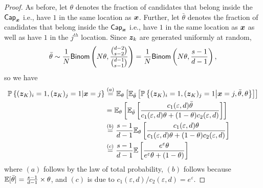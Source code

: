 \begin{proof}
As before, let $\theta$ denotes the fraction of candidates that belong inside the $\mathsf{Cap}_{{\boldsymbol{x}}}$ i.e., have $1$ in the same location as ${\boldsymbol{x}}$. Further, let $\bar{\theta}$ denotes the fraction of candidates that belong inside the $\mathsf{Cap}_{{\boldsymbol{x}}}$ i.e., have $1$ in the same location as ${\boldsymbol{x}}$ as well as have $1$ in the $j^{th}$ location. Since ${\boldsymbol{z}}_k$ are generated uniformly at random,
$$ \bar{\theta} \sim \frac{1}{N} \mathsf{Binom}\left( N\theta, \frac{\binom{d-2}{s-2}}{\binom{d-1}{s-1}} \right) = \frac{1}{N} \mathsf{Binom}\left( N\theta, \frac{s-1}{d-1} \right),$$ so we have
\begin{align}
    \mathbb{P}\left\{ ({\boldsymbol{z}}_K)_i = 1, ({\boldsymbol{z}}_K)_j = 1 | {\boldsymbol{x}} = j \right\} 
    & \stackrel{(a)}{=} \mathbb{E}_{\theta}\left[ \mathbb{E}_{\bar{\theta}}\left[ \mathbb{P}\left\{ ({\boldsymbol{z}}_K)_i = 1, ({\boldsymbol{z}}_K)_j = 1 \middle\vert {\boldsymbol{x}} = j, \bar{\theta}, \theta \right\} \right]\right] \\
    & = \mathbb{E}_{\theta}\left[ \mathbb{E}_{\bar{\theta}}\left[ \frac{ c_1(\varepsilon,d)\bar{\theta}}{ c_1(\varepsilon,d) \theta  + (1 - \theta) c_2(\varepsilon,d)} \right]\right] \\ 
    & \stackrel{(b)}{=} \frac{s-1}{d-1}\mathbb{E}_{\theta}\left[ \frac{ c_1(\varepsilon,d) \theta}{ c_1(\varepsilon,d)\theta +(1-\theta) c_2(\varepsilon,d)} \right] \\
    & \stackrel{(c)}{=} \frac{s-1}{d-1}\mathbb{E}\left[ \frac{e^\varepsilon \theta}{e^\varepsilon \theta + (1-\theta)} \right] \label{eq:Step1}
\end{align}
where $(a)$ follows by the law of total probability, $(b)$ follows because $\mathbb{E}[\bar{\theta}] = \frac{s-1}{d-1} \times \theta$, and $(c)$ is due to $c_1(\varepsilon,d)/c_2(\varepsilon,d) = e^\varepsilon$.



\end{proof}
